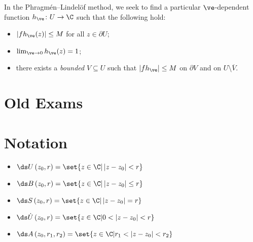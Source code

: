 \documentclass[10pt]{mypackage}
\begin{document}
In the Phragmén--Lindelöf method, we seek to find a particular $\ve$-dependent function $h_{\ve}\colon U\rightarrow \C$ such that the following hold:
\begin{itemize}
  \item $\left\vert fh_{\ve}(z) \right\vert \leq M$ for all $z\in \partial U$;
  \item $\lim_{\ve\rightarrow 0} h_{\ve}(z) = 1$;
  \item there exists a \textit{bounded} $V\subseteq U$ such that $\left\vert fh_{\ve} \right\vert\leq M$ on $\partial V$ and on $U\setminus \overline{V}$.
\end{itemize}
\section{Old Exams}%
\section{Notation}%
\begin{itemize}
  \item $\ds U\left( z_0,r \right) = \set{z\in \C | \left\vert z-z_0 \right\vert < r}$
  \item $\ds B\left( z_0,r \right) = \set{z\in \C | \left\vert z-z_0 \right\vert \leq r}$
  \item $\ds S\left( z_0,r \right) = \set{z\in \C | \left\vert z-z_0 \right\vert = r}$
  \item $\ds \dot{U}\left( z_0,r \right) = \set{z\in \C | 0 < \left\vert z-z_0 \right\vert < r}$
  \item $\ds A\left( z_0,r_1,r_2 \right) = \set{z\in \C | r_1 < \left\vert z-z_0 \right\vert < r_2}$
\end{itemize}
\end{document}
